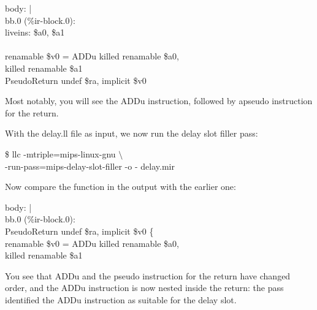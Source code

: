 \begin{tcolorbox}[colback=white,colframe=black]
body: \hspace{3cm} | \\
\hspace*{0.5cm}bb.0 (\%ir-block.0): \\
\hspace*{1cm}liveins: \$a0, \$a1 \\
\\
\hspace*{1cm}renamable \$v0 = ADDu killed renamable \$a0, \\
\hspace*{6cm}killed renamable \$a1 \\
\hspace*{1cm}PseudoReturn undef \$ra, implicit \$v0
\end{tcolorbox}

Most notably, you will see the ADDu instruction, followed by apseudo instruction for the return.\par

With the delay.ll file as input, we now run the delay slot filler pass:\par

\begin{tcolorbox}[colback=white,colframe=black]
\$ llc -mtriple=mips-linux-gnu $\setminus$ \\
\hspace*{2cm}-run-pass=mips-delay-slot-filler -o - delay.mir
\end{tcolorbox}

Now compare the function in the output with the earlier one:\par

\begin{tcolorbox}[colback=white,colframe=black]
body: \hspace{3cm} | \\
\hspace*{0.5cm}bb.0 (\%ir-block.0): \\
\hspace*{1cm}PseudoReturn undef \$ra, implicit \$v0 \{ \\
\hspace*{1.5cm}renamable \$v0 = ADDu killed renamable \$a0, \\
\hspace*{6cm}killed renamable \$a1
\end{tcolorbox}

You see that ADDu and the pseudo instruction for the return have changed order, and the ADDu instruction is now nested inside the return: the pass identified the ADDu instruction as suitable for the delay slot.\par

